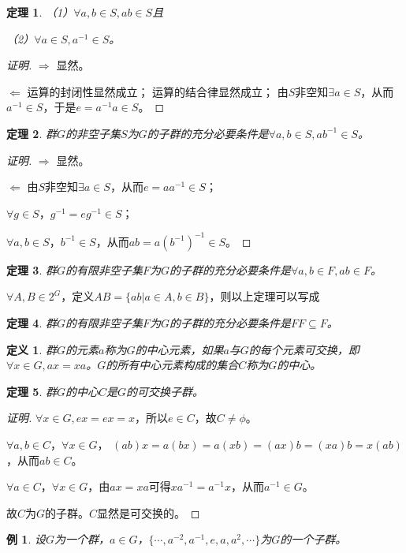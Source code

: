 \documentclass{article}
\newtheorem{Def}{定义}
\newtheorem{Thm}{定理}
\newtheorem*{Example}{例}
\begin{document}
\begin{CJK*}{UTF8}{gbsn}
\begin{Thm}
    （1）$\forall a,b\in S, ab\in S$且
  
    （2）$\forall a\in S, a^{-1}\in S$。
   \end{Thm}
  \begin{proof}[证明]
    $\Rightarrow$ 显然。
  
    $\Leftarrow$
    运算的封闭性显然成立；
    运算的结合律显然成立；
    由$S$非空知$\exists a\in S$，从而$a^{-1}\in S$，于是$e=a^{-1}a\in S$。
  \end{proof}
   \begin{Thm}
    群$G$的非空子集$S$为$G$的子群的充分必要条件是$\forall a,b\in S, ab^{-1}\in S$。
   \end{Thm}
   \begin{proof}[证明]
    $\Rightarrow$ 显然。
  
    $\Leftarrow$
    由$S$非空知$\exists a\in S$，从而$e=aa^{-1}\in S$；
  
    $\forall g\in S$，$g^{-1}=eg^{-1}\in S$；
  
    $\forall a,b\in S$，$b^{-1}\in S$，从而$ab=a(b^{-1})^{-1}\in S$。
  \end{proof}
  
   \begin{Thm}
    群$G$的有限非空子集$F$为$G$的子群的充分必要条件是$\forall a,b\in F, ab\in F$。
   \end{Thm}
  
   $\forall A,B\in 2^G$，定义$AB=\{ab|a\in A,b\in B\}$，则以上定理可以写成
  
   \begin{Thm}
    群$G$的有限非空子集$F$为$G$的子群的充分必要条件是$FF\subseteq F$。
   \end{Thm}
   \begin{Def}
    群$G$的元素$a$称为$G$的中心元素，如果$a$与$G$的每个元素可交换，即$\forall x\in G, ax=xa$。$G$的所有中心元素构成的集合$C$称为$G$的中心。
   \end{Def}
   \begin{Thm}
    群$G$的中心$C$是$G$的可交换子群。
   \end{Thm}
  \begin{proof}[证明]
  $\forall x\in G, ex=ex=x$，所以$e\in C$，故$C\neq \phi$。
  
  $\forall a,b\in C$，$\forall x\in G$，
  $(ab)x=a(bx)=a(xb)=(ax)b=(xa)b=x(ab)$，从而$ab\in C$。
  
  $\forall a\in C$，$\forall x\in G$，由$ax=xa$可得$xa^{-1}=a^{-1}x$，从而$a^{-1}\in G$。
  
  故$C$为$G$的子群。$C$显然是可交换的。
  \end{proof}
  \begin{Example}
    设$G$为一个群，$a\in G$，$\{\cdots,a^{-2},a^{-1},e,a,a^2,\cdots\}$为$G$的一个子群。
  \end{Example}
  

\end{CJK*}
\end{document}
